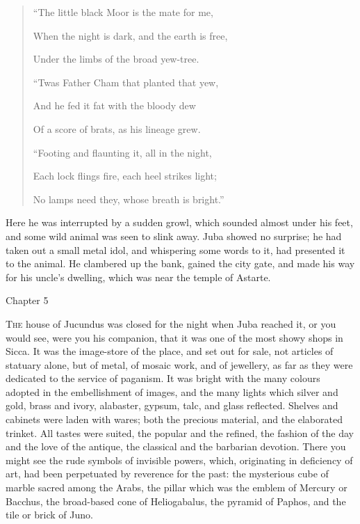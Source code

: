 \begin{quote}

``The little black Moor is the mate for me,

When the night is dark, and the earth is free,

Under the limbs of the broad yew-tree.

``Twas Father Cham that planted that yew,

And he fed it fat with the bloody dew

Of a score of brats, as his lineage grew.

``Footing and flaunting it, all in the night,

Each lock flings fire, each heel strikes light;

No lamps need they, whose breath is bright.''

\end{quote}

Here he was interrupted by a sudden growl, which sounded almost
under his feet, and some wild animal was seen to slink away. Juba
showed no surprise; he had taken out a small metal idol, and
whispering some words to it, had presented it to the animal. He
clambered up the bank, gained the city gate, and made his way for his
uncle's dwelling, which was near the temple of Astarte.

Chapter 5


T\textsc{he} house of Jucundus was closed for the night when Juba
reached it, or you would see, were you his companion, that it was one
of the most showy shops in Sicca. It was the image-store of the place,
and set out for sale, not articles of statuary alone, but of metal, of
mosaic work, and of jewellery, as far as they were dedicated to the
service of paganism. It was bright with the many colours adopted in
the embellishment of images, and the many lights which silver and
gold, brass and ivory, alabaster, gypsum, talc, and glass reflected.
Shelves and cabinets were laden with wares; both the precious
material, and the elaborated trinket. All tastes were suited, the
popular and the refined, the fashion of the day and the love of the
antique, the classical and the barbarian devotion. There you might see
the rude symbols of invisible powers, which, originating in deficiency
of art, had been perpetuated by reverence for the past: the mysterious
cube of marble sacred among the Arabs, the pillar which was the emblem
of Mercury or Bacchus, the broad-based cone of Heliogabalus, the
pyramid of Paphos, and the tile or brick of Juno.

